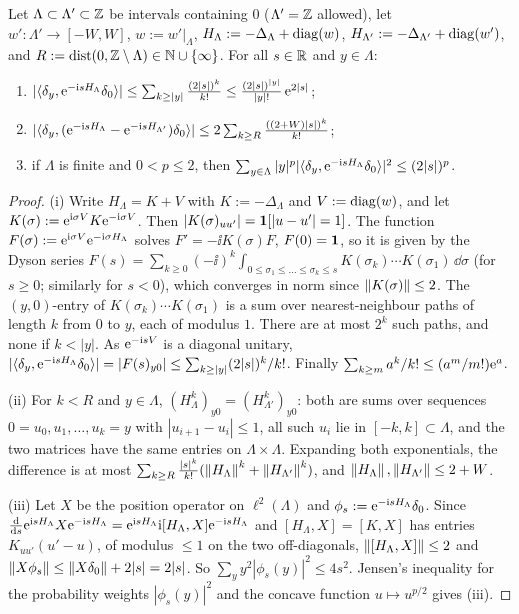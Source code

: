 \begin{lemma}\label{lem:dimerTL}
Let $\Lambda\subset\Lambda'\subset\mathbb{Z}$ be intervals containing $0$ ($\Lambda'=\mathbb{Z}$ allowed), let
$w':\Lambda'\to[-W,W]$, $w:=w'|_\Lambda$, $H_\Lambda:=-\Delta_\Lambda+\operatorname{diag}(w)$,
$H_{\Lambda'}:=-\Delta_{\Lambda'}+\operatorname{diag}(w')$, and $R:=\operatorname{dist}(0,\mathbb{Z}\setminus\Lambda)\in\mathbb{N}\cup\{\infty\}$.  For
all $s\in\mathbb{R}$ and $y\in\Lambda$:
\begin{enumerate}[label=(\roman*)]
\item $|\langle\delta_y,\mathrm{e}^{-\mathrm{i} sH_\Lambda}\delta_0\rangle|\le\sum_{k\ge|y|}\frac{(2|s|)^k}{k!}\le\frac{(2|s|)^{|y|}}{|y|!}\,\mathrm{e}^{2|s|}$;
\item $|\langle\delta_y,(\mathrm{e}^{-\mathrm{i} sH_\Lambda}-\mathrm{e}^{-\mathrm{i} sH_{\Lambda'}})\delta_0\rangle|\le2\sum_{k\ge R}\frac{((2+W)|s|)^k}{k!}$;
\item if $\Lambda$ is finite and $0<p\le2$, then $\sum_{y\in\Lambda}|y|^p|\langle\delta_y,\mathrm{e}^{-\mathrm{i} sH_\Lambda}\delta_0\rangle|^2\le(2|s|)^p$.
\end{enumerate}
\end{lemma}

\begin{proof}
(i) Write $H_\Lambda=K+V$ with $K:=-\Delta_\Lambda$ and $V:=\operatorname{diag}(w)$, and let
$K(\sigma):=\mathrm{e}^{\mathrm{i}\sigma V}K\mathrm{e}^{-\mathrm{i}\sigma V}$.  Then $|K(\sigma)_{uu'}|=\mathbf{1}[|u-u'|=1]$.  The function
$F(\sigma):=\mathrm{e}^{\mathrm{i}\sigma V}\mathrm{e}^{-\mathrm{i}\sigma H_\Lambda}$ solves $F'=-\ii K(\sigma)F$, $F(0)=\mathbf{1}$, so it is
given by the Dyson series
$F(s)=\sum_{k\ge0}(-\ii)^k\int_{0\le\sigma_1\le\dots\le\sigma_k\le s}K(\sigma_k)\cdots K(\sigma_1)\,\dd\sigma$
(for $s\ge0$; similarly for $s<0$), which converges in norm since $\left\|K(\sigma)\right\|\le2$.  The
$(y,0)$-entry of $K(\sigma_k)\cdots K(\sigma_1)$ is a sum over nearest-neighbour paths of length $k$
from $0$ to $y$, each of modulus $1$.  There are at most $2^k$ such paths, and none if $k<|y|$.  As
$\mathrm{e}^{-\mathrm{i} sV}$ is a diagonal unitary,
$|\langle\delta_y,\mathrm{e}^{-\mathrm{i} sH_\Lambda}\delta_0\rangle|=|F(s)_{y0}|\le\sum_{k\ge|y|}(2|s|)^k/k!$.  Finally
$\sum_{k\ge m}a^k/k!\le(a^m/m!)\mathrm{e}^a$.

(ii) For $k<R$ and $y\in\Lambda$, $(H_\Lambda^k)_{y0}=(H_{\Lambda'}^k)_{y0}$: both are sums over sequences
$0=u_0,u_1,\dots,u_k=y$ with $|u_{i+1}-u_i|\le1$, all such $u_i$ lie in $[-k,k]\subset\Lambda$, and the
two matrices have the same entries on $\Lambda\times\Lambda$.  Expanding both exponentials, the
difference is at most $\sum_{k\ge R}\frac{|s|^k}{k!}(\left\|H_\Lambda\right\|^k+\left\|H_{\Lambda'}\right\|^k)$, and
$\left\|H_\Lambda\right\|,\left\|H_{\Lambda'}\right\|\le2+W$.

(iii) Let $X$ be the position operator on $\ell^2(\Lambda)$ and $\phi_s:=\mathrm{e}^{-\mathrm{i} sH_\Lambda}\delta_0$.
Since $\frac{\mathrm{d}}{\mathrm{d} s}\mathrm{e}^{\mathrm{i} sH_\Lambda}X\mathrm{e}^{-\mathrm{i} sH_\Lambda}=\mathrm{e}^{\mathrm{i} sH_\Lambda}\mathrm{i}[H_\Lambda,X]\mathrm{e}^{-\mathrm{i} sH_\Lambda}$ and
$[H_\Lambda,X]=[K,X]$ has entries $K_{uu'}(u'-u)$, of modulus $\le1$ on the two off-diagonals,
$\left\|[H_\Lambda,X]\right\|\le2$ and $\left\|X\phi_s\right\|\le\left\|X\delta_0\right\|+2|s|=2|s|$.  So
$\sum_yy^2|\phi_s(y)|^2\le4s^2$.  Jensen's inequality for the probability weights $|\phi_s(y)|^2$ and
the concave function $u\mapsto u^{p/2}$ gives (iii).
\end{proof}

